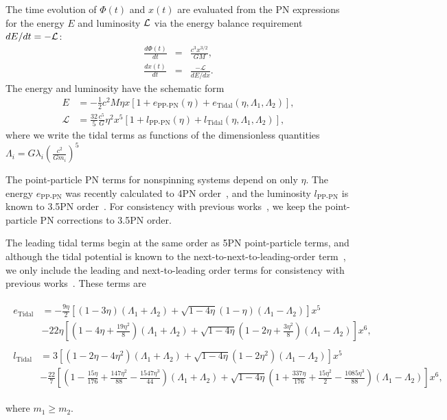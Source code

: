 \documentclass[twocolumn,prd,amssymb,aps,nofootinbib,showpacs,epsf]{revtex4}
\begin{document}
The time evolution of $\Phi(t)$ and $x(t)$ are evaluated from the PN expressions for the energy $E$ and luminosity ${\cal L}$ via the energy balance requirement $dE/dt=-{\cal L}$:
\begin{eqnarray}
\label{eq:dPhidt}
\frac{d\Phi(t)}{dt}&=&\frac{c^3 x^{3/2}}{G M},\\
\label{eq:dxdt}
\frac{d x(t)}{dt}&=&\frac{-\mathcal{L}}{dE/dx}.
\end{eqnarray}
The energy and luminosity have the schematic form
\begin{align}
E &= - \frac{1}{2} c^2 M \eta x \left[1 + e_\text{PP-PN}(\eta) + e_\text{Tidal}(\eta, \Lambda_1, \Lambda_2)\right], \\
\mathcal{L} &= \frac{32}{5} \frac{c^5}{G} \eta^2 x^5 \left[ 1 + l_\text{PP-PN}(\eta) + l_\text{Tidal}(\eta, \Lambda_1, \Lambda_2)\right],
\end{align}
where we write the tidal terms as functions of the dimensionless quantities $\Lambda_i = G\lambda_i \left(\frac{c^2}{G m_i}\right)^5$

The point-particle PN terms for nonspinning systems depend on only $\eta$. The energy $e_\text{PP-PN}$ was recently calculated to 4PN order~\cite{BiniDamour2013, FoffaSturani2014}, and the luminosity $l_\text{PP-PN}$ is known to 3.5PN order~\cite{Blanchet2014Review}. For consistency with previous works~\cite{WadeCreightonOchsner2014, DelPozzoLiAgathos2013, Favata2014, YagiYunes2014}, we keep the point-particle PN corrections to 3.5PN order.

The leading tidal terms begin at the same order as 5PN point-particle terms, and although the tidal potential is known to the next-to-next-to-leading-order term~\cite{BiniDamourFaye2012}, we only include the leading and next-to-leading order terms for consistency with previous works~\cite{WadeCreightonOchsner2014, DelPozzoLiAgathos2013, Favata2014, YagiYunes2014}. These terms are~\cite{VinesFlanaganHinderer2011}
\begin{widetext}
\begin{align}
\begin{split}
e_\text{Tidal} &= -\frac{9\eta}{2} \left[ (1-3\eta)(\Lambda_1+\Lambda_2) + \sqrt{1-4\eta}(1-\eta)(\Lambda_1-\Lambda_2) \right]x^5 \\
& - 22\eta \left[ \left(1-4\eta+\frac{19\eta^2}{8}\right)(\Lambda_1+\Lambda_2) + \sqrt{1-4\eta}\left(1-2\eta+\frac{3\eta^2}{8}\right)(\Lambda_1-\Lambda_2) \right]x^6,
\end{split} \\
\begin{split}
l_\text{Tidal} &= 3 \left[ (1-2\eta-4\eta^2)(\Lambda_1+\Lambda_2) + \sqrt{1-4\eta}(1-2\eta^2)(\Lambda_1-\Lambda_2) \right]x^5 \\
& - \frac{22}{7} \left[ \left(1-\frac{15\eta}{176}+\frac{147\eta^2}{88}-\frac{1547\eta^3}{44}\right)(\Lambda_1+\Lambda_2) + \sqrt{1-4\eta}\left(1+\frac{337\eta}{176}+\frac{15\eta^2}{2}-\frac{1085\eta^3}{88}\right)(\Lambda_1-\Lambda_2) \right]x^6,
\end{split}
\end{align}
\end{widetext}
where $m_1 \ge m_2$.
\end{document}
